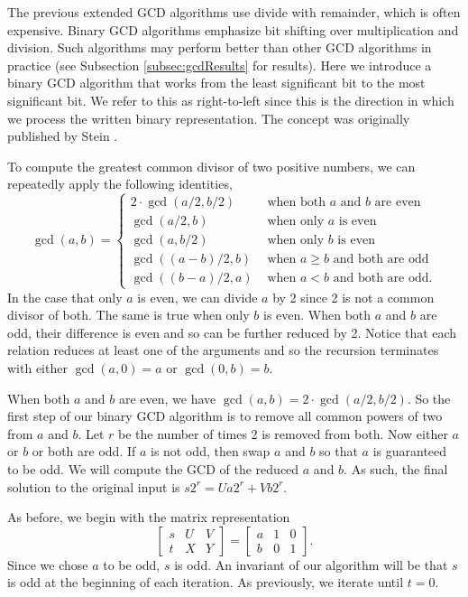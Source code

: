 \documentclass{ucalgthes1}
\theoremstyle{definition}
\newcommand{\matrixThreeTwo}[6]{\left[ \begin{array}{rrr} #1 & #2 & #3 \\ #4 & #5 & #6 \end{array} \right]}
\begin{document}
The previous extended GCD algorithms use divide with remainder, which is often expensive.  Binary GCD algorithms emphasize bit shifting over multiplication and division.  Such algorithms may perform better than other GCD algorithms in practice (see Subsection \ref{subsec:gcdResults} for results).  Here we introduce a binary GCD algorithm that works from the least significant bit to the most significant bit.  We refer to this as right-to-left since this is the direction in which we process the written binary representation.  The concept was originally published by Stein \cite{Stein1967}.

To compute the greatest common divisor of two positive numbers, we can repeatedly apply the following identities,
\[
	\gcd(a, b) = \begin{cases}
		2 \cdot \gcd(a/2, b/2) & \textrm{ when both $a$ and $b$ are even} \\
		\gcd(a/2, b) & \textrm{ when only $a$ is even} \\
		\gcd(a, b/2) & \textrm{ when only $b$ is even} \\
		\gcd((a-b)/2, b) & \textrm{ when $a \ge b$ and both are odd} \\
		\gcd((b-a)/2, a) & \textrm{ when $a < b$ and both are odd}.
	\end{cases}
\]
In the case that only $a$ is even, we can divide $a$ by 2 since 2 is not a common divisor of both.  The same is true when only $b$ is even.  When both $a$ and $b$ are odd, their difference is even and so can be further reduced by 2.  Notice that each relation reduces at least one of the arguments and so the recursion terminates with either $\gcd(a, 0) = a$ or $\gcd(0, b) = b$.

When both $a$ and $b$ are even, we have $\gcd(a, b) = 2 \cdot \gcd(a/2, b/2)$.  So the first step of our binary GCD algorithm is to remove all common powers of two from $a$ and $b$.  Let $r$ be the number of times 2 is removed from both.  Now either $a$ or $b$ or both are odd.  If $a$ is not odd, then swap $a$ and $b$ so that $a$ is guaranteed to be odd.  We will compute the GCD of the reduced $a$ and $b$.  As such, the final solution to the original input is $s2^r = Ua2^r + Vb2^r$.

As before, we begin with the matrix representation
\[
	\matrixThreeTwo{s}{U}{V}{t}{X}{Y} = \matrixThreeTwo{a}{1}{0}{b}{0}{1}.
\]
Since we chose $a$ to be odd, $s$ is odd.  An invariant of our algorithm will be that $s$ is odd at the beginning of each iteration.  As previously, we iterate until $t=0$.
\end{document}

